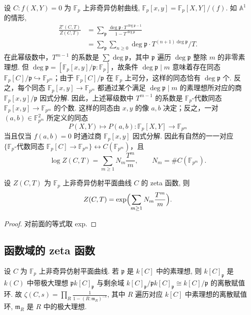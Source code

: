 设 $C\colon f(X, Y) = 0$ 为 $\mathbb{F}_p$ 上非奇异仿射曲线, $\mathbb{F}_p[x, y] = \mathbb{F}_p[X, Y]/(f)$. 如 $\mathbb{A}^1$ 的情形,
\begin{align*}
    \frac{Z'(C, T)}{Z(C, T)} &= \sum_{\mathfrak{p}}\frac{\deg\mathfrak{p}\cdot T^{\deg\mathfrak{p}-1}}{1 - T^{\deg\mathfrak{p}}} \\ & = \sum_{\mathfrak{p}}\sum_{n\ge 0}\deg\mathfrak{p}\cdot T^{(n+1)\deg\mathfrak{p}}/T.
\end{align*}
在此幂级数中，$T^{m-1}$ 的系数是 $\sum\deg\mathfrak{p}$，其中 $\mathfrak{p}$ 遍历 $\deg\mathfrak{p}$ 整除 $m$ 的非零素理想. 但 $\deg\mathfrak{p} = [\mathbb{F}_p[x, y]/\mathfrak{p}:\mathbb{F}_p]$，故条件 $\deg\mathfrak{p}\mid m$ 意味着存在同态 $\mathbb{F}_p[C]/\mathfrak{p}\hookrightarrow\mathbb{F}_{p^m}$；由于 $\mathbb{F}_p[C]/\mathfrak{p}$ 在 $\mathbb{F}_p$ 上可分，这样的同态恰有 $\deg\mathfrak{p}$ 个. 反之，每个同态 $\mathbb{F}_p[x, y]\to\mathbb{F}_{p^m}$ 都通过某个满足 $\deg\mathfrak{p}\mid m$ 的素理想所对应的商 $\mathbb{F}_p[x, y]/\mathfrak{p}$ 因式分解. 因此，上述幂级数中 $T^{m-1}$ 的系数是 $\mathbb{F}_p$-代数同态 $\mathbb{F}_p[x, y]\to\mathbb{F}_{p^m}$ 的个数. 这样的同态由 $x, y$ 的像 $a, b$ 决定；反之，一对 $(a,b)\in\mathbb{F}_{p^m}^2$ 所定义的同态
\[
P(X,Y)\mapsto P(a,b)\colon\mathbb{F}_p[X,Y]\to\mathbb{F}_{p^m}
\]
当且仅当 $f(a,b)=0$ 时通过商 $\mathbb{F}_p[x,y]$ 因式分解. 因此有自然的一一对应 $\{\mathbb{F}_p\text{-代数同态 }\mathbb{F}_p[C]\to\mathbb{F}_{p^m}\}\leftrightarrow C(\mathbb{F}_{p^m})$，且
\[
\log Z(C, T) = \sum_{m\ge 1}N_m\frac{T^m}{m}, \qquad N_m = \#C(\mathbb{F}_{p^m}).
\]

\begin{proposition} \label{thm:4.9.8} 
设 $Z(C, T)$ 为 $\mathbb{F}_p$ 上非奇异仿射平面曲线 $C$ 的 zeta 函数, 则
\[
Z(C, T) = \exp\Bigl(\sum_{m\ge 1}N_m\frac{T^m}{m}\Bigr).
\]
\end{proposition}

\begin{proof}
对前面的等式取 exp.
\end{proof}

\subsection*{函数域的 zeta 函数}

设 $C$ 为 $\mathbb{F}_p$ 上非奇异仿射平面曲线. 若 $\mathfrak{p}$ 是 $k[C]$ 中的素理想, 则 $k[C]_\mathfrak{p}$ 是 $k(C)$ 中带极大理想 $\mathfrak{p}k[C]_\mathfrak{p}$ 与剩余域 $k[C]_\mathfrak{p}/\mathfrak{p}k[C]_\mathfrak{p}\cong k[C]/\mathfrak{p}$ 的离散赋值环. 故 $\zeta(C, s) = \prod_R\frac{1}{1-(R:\mathfrak{m}_R)^{-s}}$, 其中 $R$ 遍历对应 $k[C]$ 中素理想的离散赋值环, $\mathfrak{m}_R$ 是 $R$ 中的极大理想.

